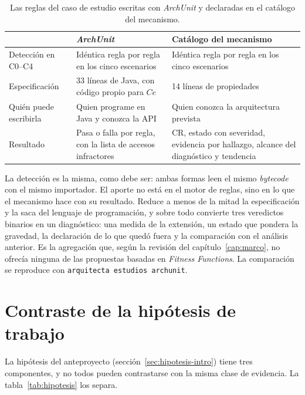\begin{table}[H]
\centering
\caption{Las reglas del caso de estudio escritas con \textit{ArchUnit} y declaradas en el catálogo del mecanismo.}
\label{tab:aporte}
\footnotesize
\begin{tabularx}{\textwidth}{p{3.3cm}XX}
\toprule
& \textbf{\textit{ArchUnit}} & \textbf{Catálogo del mecanismo} \\
\midrule
Detección en C0--C4 & Idéntica regla por regla en los cinco escenarios & Idéntica regla por regla en los cinco escenarios \\
\midrule
Especificación & 33 líneas de Java, con código propio para $Ce$ & 14 líneas de propiedades \\
\midrule
Quién puede escribirla & Quien programe en Java y conozca la API & Quien conozca la arquitectura prevista \\
\midrule
Resultado & Pasa o falla por regla, con la lista de accesos infractores & CR, estado con severidad, evidencia por hallazgo, alcance del diagnóstico y tendencia \\
\bottomrule
\end{tabularx}
\end{table}

La detección es la misma, como debe ser: ambas formas leen el mismo \textit{bytecode} con el mismo importador. El aporte no está en el motor de reglas, sino en lo que el mecanismo hace con su resultado. Reduce a menos de la mitad la especificación y la saca del lenguaje de programación, y sobre todo convierte tres veredictos binarios en un diagnóstico: una medida de la extensión, un estado que pondera la gravedad, la declaración de lo que quedó fuera y la comparación con el análisis anterior. Es la agregación que, según la revisión del capítulo~\ref{cap:marco}, no ofrecía ninguna de las propuestas basadas en \textit{Fitness Functions}. La comparación se reproduce con \texttt{arquitecta estudios archunit}.

\section{Contraste de la hipótesis de trabajo}
\label{sec:hipotesis}
La hipótesis del anteproyecto (sección~\ref{sec:hipotesis-intro}) tiene tres componentes, y no todos pueden contrastarse con la misma clase de evidencia. La tabla~\ref{tab:hipotesis} los separa.

